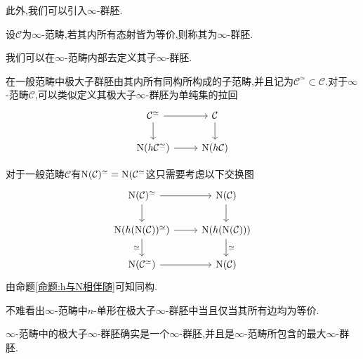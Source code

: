 此外,我们可以引入$\infty$-群胚.
\begin{definition}
    设$\mathcal{C}$为$\infty$-范畴,若其内所有态射皆为等价,则称其为$\infty$-群胚.
\end{definition}
我们可以在$\infty$-范畴内部去定义其子$\infty$-群胚.
\begin{definition}\label{定义:极大子无穷群胚}
    在一般范畴中极大子群胚由其内所有同构所构成的子范畴,并且记为$\mathcal{C}^{\simeq}\subset \mathcal{C}$.对于$\infty$-范畴$\mathcal{C}$,可以类似定义其极大子$\infty$-群胚为单纯集的拉回
    \[\begin{tikzcd}
	{\mathcal{C}^{\simeq}} & {\mathcal{C}} \\
	{\nerve(h\mathcal{C}^{\simeq})} & {\nerve(h\mathcal{C})}
	\arrow[from=1-1, to=1-2]
	\arrow[from=1-1, to=2-1]
	\arrow[from=1-2, to=2-2]
	\arrow[from=2-1, to=2-2]
    \end{tikzcd}\]
\end{definition}
\begin{remark}
    对于一般范畴$\mathcal{C}$有$\operatorname{N}(\mathcal{C})^{\simeq} = \operatorname{N}(\mathcal{C}^{\simeq}$这只需要考虑以下交换图
    \[\begin{tikzcd}
	{\nerve(\mathcal{C})^{\simeq }} & {\nerve(\mathcal{C})} \\
	{\nerve(h(\nerve(\mathcal{C}))^{\simeq})} & {\nerve(h(\nerve(\mathcal{C})))} \\
	{\nerve(\mathcal{C}^{\simeq})} & {\nerve(\mathcal{C})}
	\arrow[from=1-1, to=1-2]
	\arrow[from=1-1, to=2-1]
	\arrow[from=1-2, to=2-2]
	\arrow[from=2-1, to=2-2]
	\arrow["\simeq"', from=2-1, to=3-1]
	\arrow["\simeq", from=2-2, to=3-2]
	\arrow[from=3-1, to=3-2]
    \end{tikzcd}\]
    由命题\ref{命题:h与N相伴随}可知同构.
\end{remark}
不难看出$\infty$-范畴中$n$-单形在极大子$\infty$-群胚中当且仅当其所有边均为等价.
\begin{proposition}
    $\infty$-范畴中的极大子$\infty$-群胚确实是一个$\infty$-群胚,并且是$\infty$-范畴所包含的最大$\infty$-群胚.
\end{proposition}
